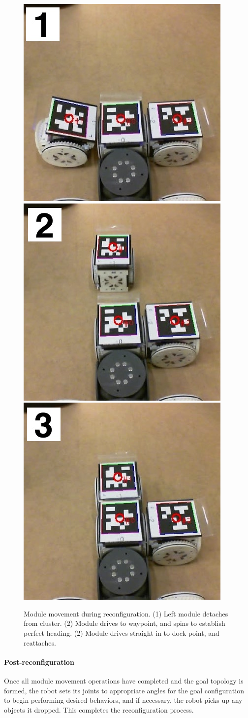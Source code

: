 \documentclass[conference]{IEEEtran}
\begin{document}
\begin{figure}[t]
\begin{center}
  \includegraphics[width=0.32\columnwidth]{images/reconf_detach.jpg}
  \includegraphics[width=0.32\columnwidth]{images/reconf_waypoint.jpg}
  \includegraphics[width=0.32\columnwidth]{images/reconf_attach.jpg}
  \caption{Module movement during reconfiguration. (1) Left module detaches from cluster. (2) Module drives to waypoint, and spins to establish perfect heading. (2) Module drives straight in to dock point, and reattaches.}
  \label{fig:reconf}
\end{center}
\end{figure}

\paragraph{Post-reconfiguration} Once all module movement operations have completed and the goal topology is formed, the robot sets its joints to appropriate angles for the goal configuration to begin performing desired behaviors, and if necessary, the robot picks up any objects it dropped. This completes the reconfiguration process. 
%
\end{document}
